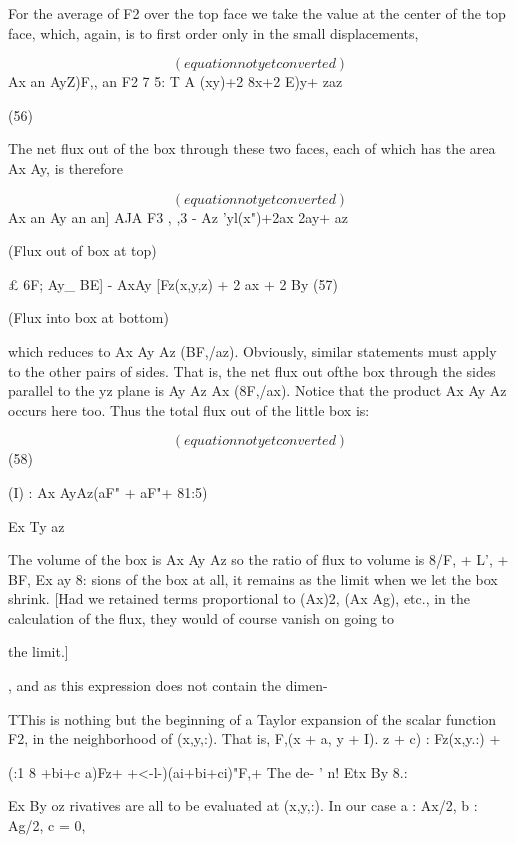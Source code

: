 For the average of F2 over the top face we take the value at the
center of the top face, which, again, is to first order only in the small
displacements,

\begin{equation}
(equation not yet converted)
\end{equation}
Ax an AyZ)F,, an
F2 7 5: T A
(xy)+2 8x+2 E)y+ zaz

(56)

The net flux out of the box through these two faces, each of which has
the area Ax Ay, is therefore

\begin{equation}
(equation not yet converted)
\end{equation}
Ax an Ay an an]
AJA F3 , ,3 - Az
'yl(x")+2ax 2ay+ az

 
(Flux out of box at top)

£ 6F; Ay_ BE]
- AxAy [Fz(x,y,z) + 2 ax + 2 By (57)

(Flux into box at bottom)

which reduces to Ax Ay Az (BF,/az). Obviously, similar statements
must apply to the other pairs of sides. That is, the net flux out ofthe
box through the sides parallel to the yz plane is Ay Az Ax (8F,/ax).
Notice that the product Ax Ay Az occurs here too. Thus the total
flux out of the little box is:

\begin{equation}
(equation not yet converted)
\end{equation}
(58)

(I) : Ax AyAz(aF" + aF"+ 81:5)

Ex Ty az

The volume of the box is Ax Ay Az so the ratio of flux to volume is
8/F, + L', + BF,
Ex ay 8:
sions of the box at all, it remains as the limit when we let the box
shrink. [Had we retained terms proportional to (Ax)2, (Ax Ag), etc.,
in the calculation of the flux, they would of course vanish on going to

the limit.]

, and as this expression does not contain the dimen-

TThis is nothing but the beginning of a Taylor expansion of the scalar function F2,
in the neighborhood of (x,y,:). That is, F,(x + a, y + I). z + c) : Fz(x,y.:) +

(:1 8 +bi+c a)Fz+  +<-l-)(ai+bi+ci)"F,+  The de-
' n! Etx By 8.:

Ex By oz
rivatives are all to be evaluated at (x,y,:). In our case a : Ax/2, b : Ag/2, c = 0,


